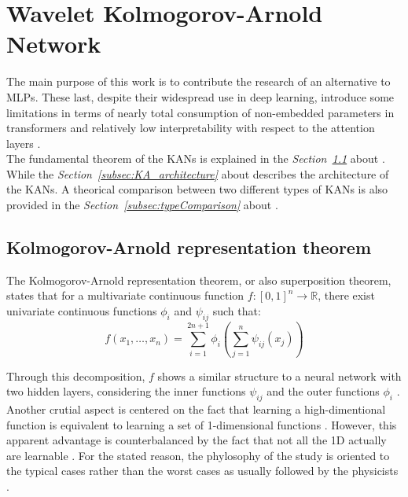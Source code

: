 \documentclass[11pt,a4paper,twocolumn]{article}
\begin{document}
\section{Wavelet Kolmogorov-Arnold Network}
\label{sec:WaveKAN}
The main purpose of this work is to contribute the research of an alternative to MLPs. These last, despite their widespread use in deep learning, introduce some limitations in terms of nearly total consumption of non-embedded parameters in transformers 
and relatively low interpretability with respect to the attention layers \cite{vaswani2023attentionneed,liu2025kankolmogorovarnoldnetworks,cunningham2023sparseautoencodershighlyinterpretable}.
\\
The fundamental theorem of the KANs is explained in the \textit{Section~\ref{sec:KA_theorem}} about \textit{}. 
While the \textit{Section~\ref{subsec:KA_architecture}} about \textit{} describes the architecture of the KANs.
A theorical comparison between two different types of KANs is also provided in the \textit{Section~\ref{subsec:typeComparison}} about \textit{}.

    \subsection{Kolmogorov-Arnold representation theorem}
    \label{sec:KA_theorem}
    \begin{theorem}
    The Kolmogorov-Arnold representation theorem, or also superposition theorem, states that for a multivariate continuous function $f:[0,1]^n \to \mathbb{R}$, there exist univariate continuous functions $\phi_i$ and $\psi_{ij}$ such that:
    \begin{equation}
        f(x_1, \ldots, x_n) = \sum_{i=1}^{2n+1} \phi_i \left( \sum_{j=1}^{n} \psi_{ij}(x_j) \right)
    \end{equation}
    \end{theorem}
    Through this decomposition, $f$ shows a similar structure to a neural network with two hidden layers, considering the inner functions $\psi_{ij}$ and the outer functions $\phi_i$ \cite{schmidthieber2021kolmogorovarnoldrepresentationtheoremrevisited}.
    \\
    Another crutial aspect is centered on the fact that learning a high-dimentional function is equivalent to learning a set of 1-dimensional functions \cite{liu2025kankolmogorovarnoldnetworks}.
    However, this apparent advantage is counterbalanced by the fact that not all the 1D actually are learnable \cite{TomasoPoggio2020TheoreticalIssuesInDeepNetworks,6796867}.
    For the stated reason, the phylosophy of the study is oriented to the typical cases rather than the worst cases as usually followed by the physicists \cite{Lin_2017}.
    
\end{document}
